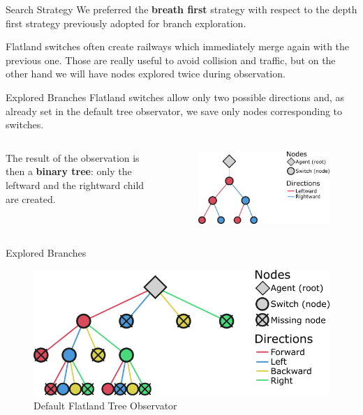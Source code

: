 \documentclass[10pt, xcolor={dvipsnames}]{beamer}
\begin{document}
\begin{frame}{Search Strategy}
    We preferred the \textbf{breath first} strategy with respect to the depth first strategy previously adopted for branch exploration.
    
    Flatland switches often create railways which immediately merge again with the previous one. Those are really useful to avoid collision and traffic, but on the other hand we will have nodes explored twice during observation. 
\end{frame}
\begin{frame}{Explored Branches}
    Flatland switches allow \alert{only two} possible directions and, as already set in the default tree observator, we save only nodes corresponding to switches. 
    
    \vspace{0.5cm}
    \begin{columns}
            The result of the observation is then a \textbf{binary tree}: only the leftward and the rightward child are created.
        
        \begin{figure}
            \centering
            \includegraphics[width=1\textwidth]{assets/environment/binaryobs.png}
        \end{figure}
            
    \end{columns}
\end{frame}

\begin{frame}{Explored Branches}
    \begin{figure}
        \centering
        \includegraphics[height=0.3\textwidth]{assets/environment/treeobs.png}
        \caption*{Default Flatland \alert{Tree Observator}}
    \end{figure}
\end{frame}
\end{document}
